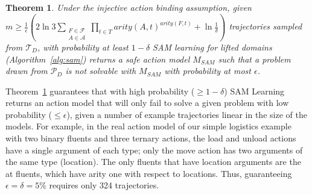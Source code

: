 \documentclass{article}
\newtheorem{theorem}{Theorem}
\newcommand{\liftf}{F}
\newcommand{\lifta}{A}
\newcommand{\sam}{\textit{SAM}\xspace}
\begin{document}
\begin{theorem}\label{sam-sample-thm}
Under the injective action binding assumption, given 
$m \geq \frac{1}{\epsilon} (2\ln 3\sum_{\substack{\liftf\in\mathcal{F}\\\lifta\in\mathcal{A}}}\prod_{t\in T}arity(\lifta,t)^{arity(\liftf,t)} + \ln \frac{1}{\delta})$
trajectories sampled from $\mathcal{T}_D$, with probability at least $1-\delta $ 
SAM learning for lifted domains (Algorithm~\ref{alg:sam}) returns a safe action model $M_\sam$ such that a problem drawn from $\mathcal{P}_D$ is not solvable with $M_\sam$ with probability at most $\epsilon$.
\end{theorem}
Theorem~\ref{sam-sample-thm} guarantees
that with high probability ($\geq 1-\delta$) SAM Learning returns an action model that will only fail to solve a given problem with low probability ($\leq \epsilon$), given a number of example trajectories linear in the size of the models.
For example, in the real action model of our simple logistics example with two binary fluents and three ternary actions, the load and unload actions have a single argument of each type; only the move action has two arguments of the same type (location). The only fluents that have location arguments are the at fluents, which have arity one with respect to locations. Thus, guaranteeing $\epsilon=\delta=5\%$ requires only 324 trajectories.
\end{document}

